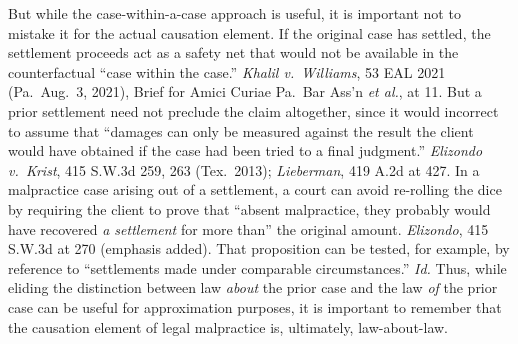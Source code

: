 \documentclass[
  12pt,
  letterpaper,
]{scrartcl}
\begin{document}
But while the case-within-a-case approach is useful, it is important not to mistake it for the actual causation
element. If the original case has settled, the settlement
proceeds act as a safety net that would not be available in the counterfactual
``case within the case.'' \textit{Khalil
v.~Williams}, 53 EAL 2021 (Pa.~Aug.~3, 2021), Brief for Amici Curiae Pa.~Bar
Ass'n \textit{et al.}, at 11. But a prior settlement need not preclude the claim altogether, since it would incorrect to assume that ``damages can only be measured against the result the
client would have obtained if the case had been tried to a final judgment.''
\textit{Elizondo v.~Krist}, 415 S.W.3d 259, 263 (Tex.~2013);
\textit{Lieberman}, 419 A.2d at 427. In a malpractice case arising out of a
settlement, a court can avoid re-rolling the dice by requiring the client to
prove that ``absent malpractice, they probably would have recovered \emph{a
settlement} for more than'' the original amount. \textit{Elizondo}, 415 S.W.3d
at 270 (emphasis added). That proposition can be tested, for example, by
reference to ``settlements made under comparable circumstances.'' \textit{Id.}
Thus, while eliding the distinction between law \textit{about} the prior case
and the law \textit{of} the prior case can be useful for approximation
purposes, it is important to remember that the causation element of legal
malpractice is, ultimately, law-about-law.
\end{document}
